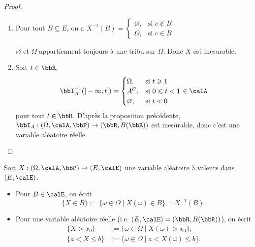 \begin{proof}
    $\ $
    \begin{enumerate}
        \item Pour tout $B \subseteq E$, on a $X^{-1}(B) =
                  \begin{cases}
                      \varnothing, & \text{si } c \notin B \\
                      \Omega,      & \text{si } c \in B
                  \end{cases}
              $

              $\varnothing$ et $\Omega$ appartiennent toujours à une tribu sur $\Omega$.
              Donc $X$ est mesurable.
        \item Soit $t \in \bbR$,
              \[ \bbI_A^{-1}(]-\infty, t]) =
                  \begin{cases}
                      \Omega,      & \text{si } t \geqslant 1     \\
                      A^C,         & \text{si } 0 \leqslant t < 1 \\
                      \varnothing, & \text{si } t < 0
                  \end{cases}
                  \in \calA \] pour tout $t \in \bbR$.
              D'après la proposition précédente, $\bbI_A: (\Omega, \calA, \bbP) \to (\bbR, B(\bbR))$ est mesurable,
              donc c'est une variable aléatoire réelle.
    \end{enumerate}
\end{proof}

\begin{rqq}[Notation]
    Soit $X: (\Omega, \calA, \bbP) \to (E, \calE)$ une variable aléatoire à valeurs dans $(E, \calE)$.
    \begin{itemize}
        \item Pour $B \in \calE$, on écrit
              \[ \{ X \in B \} := \{ \omega \in \Omega \mid X(\omega) \in B \} = X^{-1}(B). \]
        \item Pour une variable aléatoire réelle (i.e. $(E, \calE) = (\bbR, B(\bbR))$), on écrit
              \begin{align*}
                  \{ X > x_0 \}           & := \{ \omega \in \Omega \mid X(\omega) > x_0 \},           \\
                  \{ a < X \leqslant b \} & := \{ \omega \in \Omega \mid a < X(\omega) \leqslant b \}.
              \end{align*}
    \end{itemize}
\end{rqq}

